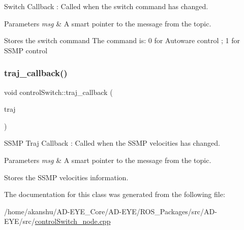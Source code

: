 Switch Callback \+: Called when the switch command has changed. 


\begin{DoxyParams}{Parameters}
{\em msg} & A smart pointer to the message from the topic.\\
\hline
\end{DoxyParams}
Stores the switch command The command is\+: 0 for Autoware control ; 1 for S\+S\+MP control \mbox{\label{classcontrolSwitch_a1500999ae9e898eb74268c7f122fc71a}} 
\subsubsection{\texorpdfstring{traj\+\_\+callback()}{traj\_callback()}}
{\footnotesize\ttfamily void control\+Switch\+::traj\+\_\+callback (\begin{DoxyParamCaption}\item[{const rcv\+\_\+common\+\_\+msgs\+::current\+\_\+traj\+\_\+info\+::\+Const\+Ptr \&}]{traj }\end{DoxyParamCaption})\hspace{0.3cm}{\ttfamily [inline]}}



S\+S\+MP Traj Callback \+: Called when the S\+S\+MP velocities has changed. 


\begin{DoxyParams}{Parameters}
{\em msg} & A smart pointer to the message from the topic.\\
\hline
\end{DoxyParams}
Stores the S\+S\+MP velocities information. 

The documentation for this class was generated from the following file\+:\begin{DoxyCompactItemize}
\item 
/home/akanshu/\+A\+D-\/\+E\+Y\+E\+\_\+\+Core/\+A\+D-\/\+E\+Y\+E/\+R\+O\+S\+\_\+\+Packages/src/\+A\+D-\/\+E\+Y\+E/src/\hyperlink{controlSwitch__node_8cpp}{control\+Switch\+\_\+node.\+cpp}\end{DoxyCompactItemize}
